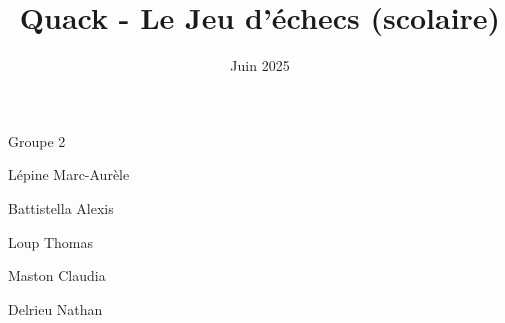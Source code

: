 \documentclass[12pt]{article}
\title{\Huge\textbf{Quack - Le Jeu d'échecs (scolaire)}}
\date{Juin 2025}
\begin{document}
\maketitle


\renewcommand{\headrulewidth}{0mm} %
\renewcommand{\footrulewidth}{0.1mm} %


\centerline{Groupe 2}
\vspace{\fill}
Lépine Marc-Aurèle \par
Battistella Alexis \par
Loup Thomas \par
Maston Claudia \par
Delrieu Nathan



\newpage

\renewcommand\contentsname{\centering Table des matières}
\renewcommand\footnoterule{}

\tableofcontents

\newpage
\end{document}
